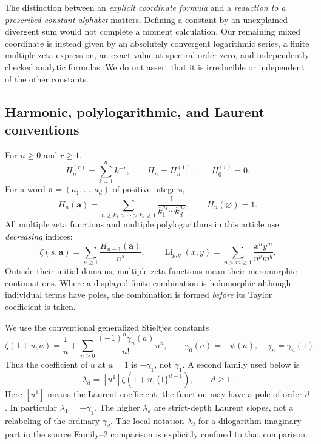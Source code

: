 \documentclass[11pt,a4paper]{article}
\numberwithin{equation}{section}
\theoremstyle{definition}
\theoremstyle{remark}
\DeclareMathOperator{\Li}{Li}
\begin{document}
The distinction between an \emph{explicit coordinate formula} and a
\emph{reduction to a prescribed constant alphabet} matters.  Defining a
constant by an unexplained divergent sum would not complete a moment
calculation.  Our remaining mixed coordinate is instead given by an
absolutely convergent logarithmic series, a finite multiple-zeta
expression, an exact value at spectral order zero, and independently
checked analytic formulas.  We do not assert that it is irreducible or
independent of the other constants.

\subsection{Harmonic, polylogarithmic, and Laurent conventions}

For $n\ge0$ and $r\ge1$,
\[
 H_n^{(r)}=\sum_{k=1}^n k^{-r},\qquad H_n=H_n^{(1)},
 \qquad H_0^{(r)}=0.
\]
For a word $\boldsymbol a=(a_1,\ldots,a_d)$ of positive integers,
\[
 H_n(\boldsymbol a)=\sum_{n\ge k_1>\cdots>k_d\ge1}
             \frac1{k_1^{a_1}\cdots k_d^{a_d}},
 \qquad H_n(\varnothing)=1.
\]
All multiple zeta functions and multiple polylogarithms in this article
use \emph{decreasing} indices:
\[
 \zeta(s,\boldsymbol a)=\sum_{n\ge1}\frac{H_{n-1}(\boldsymbol a)}{n^s},
 \qquad
 \Li_{p,q}(x,y)=\sum_{n>m\ge1}\frac{x^ny^m}{n^pm^q}.
\]
Outside their initial domains, multiple zeta functions mean their
meromorphic continuations.  Where a displayed finite combination is
holomorphic although individual terms have poles, the combination is
formed \emph{before} its Taylor coefficient is taken.

We use the conventional generalized Stieltjes constants
\begin{equation}\label{scope:stieltjes}
 \zeta(1+u,a)=\frac1u+
       \sum_{n\ge0}\frac{(-1)^n\gamma_n(a)}{n!}u^n,
 \qquad \gamma_0(a)=-\psi(a),\quad \gamma_n=\gamma_n(1).
\end{equation}
Thus the coefficient of $u$ at $a=1$ is $-\gamma_1$, not
$\gamma_1$.  A second family used below is
\begin{equation}\label{scope:lambda}
 \lambda_d=[u^1]\zeta(1+u,\{1\}^{d-1}),\qquad d\ge1.
\end{equation}
Here $[u^1]$ means the Laurent coefficient; the function may have a pole
of order $d$.  In particular $\lambda_1=-\gamma_1$.
The higher $\lambda_d$ are strict-depth Laurent slopes, not a relabeling
of the ordinary $\gamma_d$.  The local notation $\lambda_2$ for a
dilogarithm imaginary part in the source Family--2 comparison is
explicitly confined to that comparison.
\end{document}
